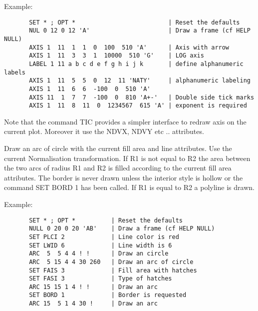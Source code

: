 \ENDVERB
   \par
Example:  
\begin{verbatim}
       SET * ; OPT *                          | Reset the defaults
       NUL 0 12 0 12 'A'                      | Draw a frame (cf HELP NULL)
       AXIS 1  11  1  1  0  100  510 'A'      | Axis with arrow
       AXIS 1  11  3  3  1  10000  510 'G'    | LOG axis
       LABEL 1 11 a b c d e f g h i j k       | define alphanumeric labels
       AXIS 1  11  5  5  0  12  11 'NATY'     | alphanumeric labeling
       AXIS 1  11  6  6  -100  0  510 'A'
       AXIS 11  1  7  7  -100  0  810 'A+-'   | Double side tick marks
       AXIS 1  11  8  11  0  1234567  615 'A' | exponent is required
\end{verbatim}
\ENDVERB
   \par
Note that the command TIC provides a simpler interface to redraw axis on 
   the current plot. Moreover it use the NDVX, NDVY etc .. attributes.  

\ENDCBIG


\BEGARG
{}
\ENDARG

   \par
Draw an arc of circle with the current fill area and line attributes.  Use 
   the current Normalisation transformation.  If R1 is not equal to R2 the 
   area between the two arcs of radius R1 and R2 is filled according to the 
   current fill area attributes.  The border is never drawn unless the 
   interior style is hollow or the command SET BORD 1 has been called. If R1 
   is equal to R2 a polyline is drawn.  

   \par
Example:  
\begin{verbatim}
       SET * ; OPT *          | Reset the defaults
       NULL 0 20 0 20 'AB'    | Draw a frame (cf HELP NULL)
       SET PLCI 2             | Line color is red
       SET LWID 6             | Line width is 6
       ARC  5  5 4 4 ! !      | Draw an circle
       ARC  5 15 4 4 30 260   | Draw an arc of circle
       SET FAIS 3             | Fill area with hatches
       SET FASI 3             | Type of hatches
       ARC 15 15 1 4 ! !      | Draw an arc
       SET BORD 1             | Border is requested
       ARC 15  5 1 4 30 !     | Draw an arc
\end{verbatim}

